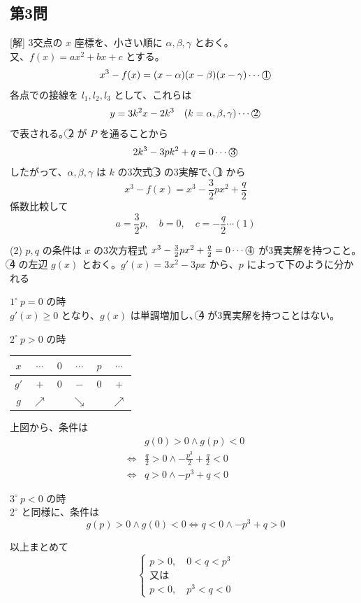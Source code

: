 \documentclass[../main.tex]{subfiles}
\begin{document}
\subsection*{第3問}
[解] 3交点の $x$ 座標を、小さい順に $\alpha, \beta, \gamma$ とおく。\\
又、$f(x) = ax^2 + bx + c$ とする。
\[
  x^3 - f(x) = (x-\alpha)(x-\beta)(x-\gamma) \cdots \text{\textcircled{1}}
\]
各点での接線を $l_1, l_2, l_3$ として、これらは
\[
  y = 3k^2 x - 2k^3 \quad (k=\alpha, \beta, \gamma) \cdots \text{\textcircled{2}}
\]
で表される。\textcircled{2} が $P$ を通ることから
\[
  2k^3 - 3pk^2 + q = 0 \cdots \text{\textcircled{3}}
\]
したがって、$\alpha, \beta, \gamma$ は $k$ の3次式 \textcircled{3} の3実解で、\textcircled{1} から
\[
  x^3 - f(x) = x^3 - \frac{3}{2}p x^2 + \frac{q}{2}
\]
係数比較して
\[
  a = \frac{3}{2}p, \quad b = 0, \quad c = -\frac{q}{2} \cdots (1)
\]

(2) $p, q$ の条件は $x$ の3次方程式 $x^3 - \frac{3}{2}px^2 + \frac{q}{2} = 0 \cdots \text{\textcircled{4}}$ が3異実解を持つこと。\textcircled{4} の左辺 $g(x)$ とおく。$g'(x) = 3x^2 - 3px$ から、$p$ によって下のように分かれる

$1^\circ \ p = 0$ の時\\
$g'(x) \ge 0$ となり、$g(x)$ は単調増加し、\textcircled{4} が3異実解を持つことはない。

$2^\circ \ p > 0$ の時\\
\begin{center}
  \begin{tabular}{|c|c|c|c|c|c|}
    \hline
    $x$ & $\cdots$ & $0$ & $\cdots$ & $p$ & $\cdots$ \\
    \hline
    $g'$ & $+$ & $0$ & $-$ & $0$ & $+$ \\
    \hline
    $g$ & $\nearrow$ & & $\searrow$ & & $\nearrow$ \\
    \hline
  \end{tabular}
\end{center}
上図から、条件は
\begin{align*}
  & g(0) > 0 \land g(p) < 0 \\
  \iff & \frac{q}{2} > 0 \land - \frac{p^3}{2} + \frac{q}{2} < 0 \\
  \iff & q > 0 \land -p^3 + q < 0
\end{align*}

$3^\circ \ p < 0$ の時\\
$2^\circ$ と同様に、条件は
\[
  g(p) > 0 \land g(0) < 0 \iff q < 0 \land -p^3 + q > 0
\]

以上まとめて
\[
  \begin{cases}
    p > 0, \quad 0 < q < p^3 \\
    \text{又は} \\
    p < 0, \quad p^3 < q < 0
  \end{cases}
\]
\end{document}
